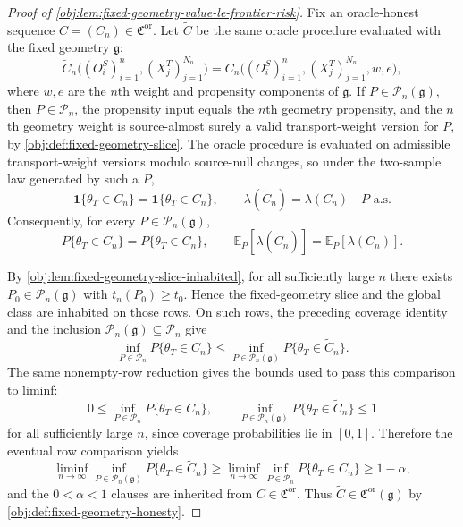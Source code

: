 \begin{proof}[Proof of \cref{obj:lem:fixed-geometry-value-le-frontier-risk}]
Fix an oracle-honest sequence \(C=(C_n)\in\mathfrak C^{\mathrm{or}}\).  Let \(\widetilde C\) be the same oracle procedure evaluated with the fixed geometry \(\mathfrak g\):
\[
\widetilde C_n\bigl((O_i^S)_{i=1}^n,(X_j^T)_{j=1}^{N_n}\bigr)
=
C_n\bigl((O_i^S)_{i=1}^n,(X_j^T)_{j=1}^{N_n},w,e\bigr),
\]
where \(w,e\) are the \(n\)th weight and propensity components of \(\mathfrak g\).  If \(P\in\mathcal P_n(\mathfrak g)\), then \(P\in\mathcal P_n\), the propensity input equals the \(n\)th geometry propensity, and the \(n\)th geometry weight is source-almost surely a valid transport-weight version for \(P\), by \cref{obj:def:fixed-geometry-slice}.  The oracle procedure is evaluated on admissible transport-weight versions modulo source-null changes, so under the two-sample law generated by such a \(P\),
\[
\mathbf 1\{\theta_T\in \widetilde C_n\}=\mathbf 1\{\theta_T\in C_n\},
\qquad
\lambda(\widetilde C_n)=\lambda(C_n)
\quad P\text{-a.s.}
\]
Consequently, for every \(P\in\mathcal P_n(\mathfrak g)\),
\[
P\{\theta_T\in \widetilde C_n\}=P\{\theta_T\in C_n\},
\qquad
\mathbb E_P[\lambda(\widetilde C_n)]=\mathbb E_P[\lambda(C_n)].
\]

By \cref{obj:lem:fixed-geometry-slice-inhabited}, for all sufficiently large \(n\) there exists \(P_0\in\mathcal P_n(\mathfrak g)\) with \(t_n(P_0)\ge t_0\).  Hence the fixed-geometry slice and the global class are inhabited on those rows.  On such rows, the preceding coverage identity and the inclusion \(\mathcal P_n(\mathfrak g)\subseteq\mathcal P_n\) give
\[
\inf_{P\in\mathcal P_n}P\{\theta_T\in C_n\}
\le
\inf_{P\in\mathcal P_n(\mathfrak g)}P\{\theta_T\in \widetilde C_n\}.
\]
The same nonempty-row reduction gives the bounds used to pass this comparison to liminf:
\[
0\le \inf_{P\in\mathcal P_n}P\{\theta_T\in C_n\},
\qquad
\inf_{P\in\mathcal P_n(\mathfrak g)}P\{\theta_T\in \widetilde C_n\}\le 1
\]
for all sufficiently large \(n\), since coverage probabilities lie in \([0,1]\).  Therefore the eventual row comparison yields
\[
\liminf_{n\to\infty}
\inf_{P\in\mathcal P_n(\mathfrak g)}
P\{\theta_T\in \widetilde C_n\}
\ge
\liminf_{n\to\infty}
\inf_{P\in\mathcal P_n}
P\{\theta_T\in C_n\}
\ge 1-\alpha,
\]
and the \(0<\alpha<1\) clauses are inherited from \(C\in\mathfrak C^{\mathrm{or}}\).  Thus \(\widetilde C\in\mathfrak C^{\mathrm{or}}(\mathfrak g)\) by \cref{obj:def:fixed-geometry-honesty}. %


\end{proof}
